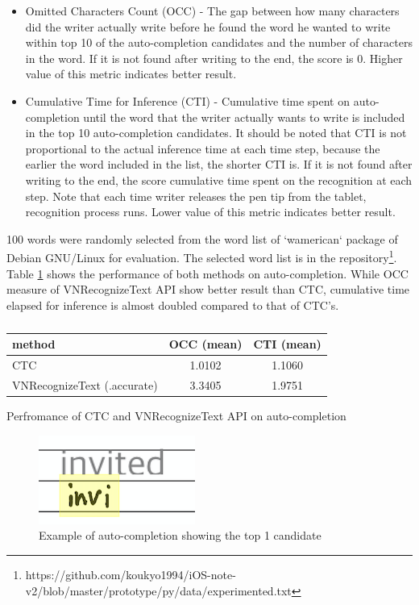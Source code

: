 \begin{itemize}
    \item Omitted Characters Count (OCC) - The gap between how many characters did the writer actually write before
    he found the word he wanted to write within top 10 of the auto-completion candidates
    and the number of characters in the word.
    If it is not found after writing to the end, the score is 0. Higher value of this metric indicates better result.
    \item Cumulative Time for Inference (CTI) - Cumulative time spent on auto-completion until the word that the writer actually
    wants to write is included in the top 10 auto-completion candidates. It should be noted that CTI is not proportional
    to the actual inference time at each time step, because the earlier the word included in the list, the shorter CTI is.
    If it is not found after writing to the end,
    the score cumulative time spent on the recognition at each step. Note that each time writer releases the pen tip from the tablet, recognition
    process runs. Lower value of this metric indicates better result.
\end{itemize}

100 words were randomly selected from the word list of `wamerican` package of Debian GNU/Linux for evaluation.
The selected word list is in the repository\footnote{https://github.com/koukyo1994/iOS-note-v2/blob/master/prototype/py/data/experimented.txt}.
Table \ref{tab:metrics} shows the performance of both methods on auto-completion. While OCC measure of
VNRecognizeText API show better result than CTC, cumulative time elapsed for inference is almost doubled
compared to that of CTC's.

\begin{table}[htbp]
    \begin{center}
        \caption{}
        \begin{tabular}{|l||c|c|} \hline
        method & OCC (mean) & CTI (mean) \\ \hline \hline
        CTC & 1.0102 & 1.1060 \\ \hline
        VNRecognizeText (.accurate) & 3.3405 & 1.9751 \\ \hline
        \end{tabular}
        \label{tab:metrics}
    \end{center}
    \centering
    Perfromance of CTC and VNRecognizeText API on auto-completion
\end{table}

\begin{figure}
    \centering
    \includegraphics[]{images/auto-completion.png}
    \caption{Example of auto-completion showing the top 1 candidate}
    \label{fig:auto-complete}
\end{figure}

